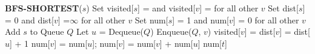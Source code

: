 \documentclass[letter,12pt]{article}
\begin{document}
\begin{algorithm}
\begin{algorithmic}[1]
\STATE \textbf{BFS-SHORTEST}($s$)
\STATE Set visited[$s$] = \TRUE \;and visited[$v$] = \FALSE \;for all
other $v$
\STATE Set dist[$s$] = 0 and dist[$v$] =$\infty$ for all other $v$
\STATE Set num[$s$] = 1 and num[$v$] = 0 for all other $v$
\STATE Add $s$ to Queue $Q$
\STATE Let $u$ = Dequeue($Q$)
\STATE Enqueue($Q$, $v$)
\STATE visited[$v$] = \TRUE
\STATE dist[$v$] = dist[$u$] + 1
\STATE num[$v$] = num[$u$];
\ELSE
{}
\STATE num[$v$] = num[$v$] + num[$u$]
\ENDIF
\ENDIF
\ENDFOR
\ENDWHILE
\RETURN num[$t$]
\end{algorithmic}
\end{algorithm}
\end{document}
